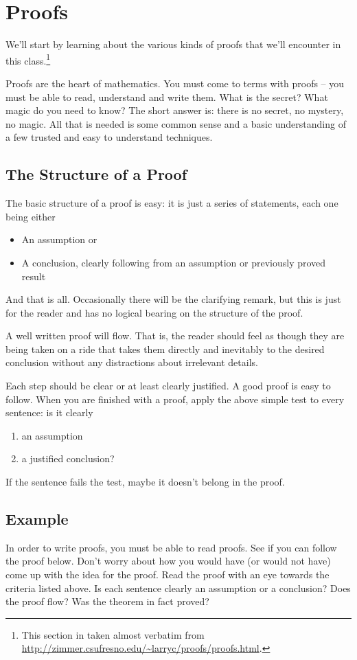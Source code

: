 
\section{Proofs}

We'll start by learning about the various kinds of proofs that we'll encounter in this class.\footnote{This section in taken almost verbatim from \url{http://zimmer.csufresno.edu/~larryc/proofs/proofs.html}.}

Proofs are the heart of mathematics. You must come to terms with proofs -- you must be able to read, understand
and write them. What is the secret? What magic do you need to know? The short answer is: there is no secret, no
mystery, no magic. All that is needed is some common sense and a basic understanding of a few trusted and easy
to understand techniques.

\subsection*{The Structure of a Proof}
The basic structure of a proof is easy: it is just a series of statements, each one being either
\begin{itemize}
	\item
	An assumption or
	\item
	A conclusion, clearly following from an assumption or previously proved result
\end{itemize}
And that is all. Occasionally there will be the clarifying remark, but this is just for the reader and has no logical
bearing on the structure of the proof.

A well written proof will flow. That is, the reader should feel as though they are being taken on a ride that takes
them directly and inevitably to the desired conclusion without any distractions about irrelevant details.

Each step
should be clear or at least clearly justified. A good proof is easy to follow.
When you are finished with a proof, apply the above simple test to every sentence: is it clearly
\begin{enumerate}
	\item an assumption
	\item a justified conclusion?
\end{enumerate}
If the sentence fails the test, maybe it doesn't belong in the proof.


\subsection*{Example}
In order to write proofs, you must be able to read proofs. See if you can follow the proof below. Don't worry
about how you would have (or would not have) come up with the idea for the proof. Read the proof with an eye
towards the criteria listed above. Is each sentence clearly an assumption or a conclusion? Does the proof flow?
Was the theorem in fact proved?

